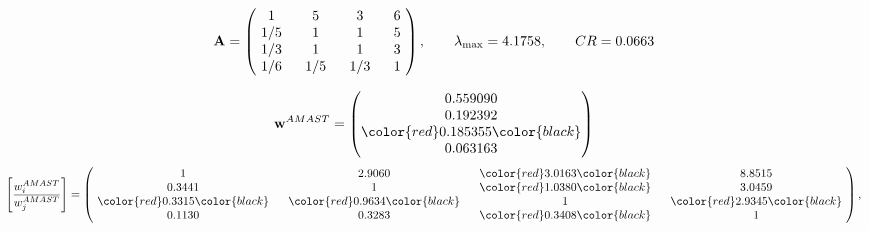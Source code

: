 \begin{example}
\begin{equation*}
\mathbf{A} =
\begin{pmatrix}
$\,\,$ 1 $\,\,$ & $\,\,$5$\,\,$ & $\,\,$3$\,\,$ & $\,\,$6 $\,\,$ \\
$\,\,$ 1/5$\,\,$ & $\,\,$ 1 $\,\,$ & $\,\,$1$\,\,$ & $\,\,$5 $\,\,$ \\
$\,\,$ 1/3$\,\,$ & $\,\,$ 1 $\,\,$ & $\,\,$ 1 $\,\,$ & $\,\,$3 $\,\,$ \\
$\,\,$ 1/6$\,\,$ & $\,\,$ 1/5$\,\,$ & $\,\,$ 1/3$\,\,$ & $\,\,$ 1  $\,\,$ \\
\end{pmatrix},
\qquad
\lambda_{\max} =
4.1758,
\qquad
CR = 0.0663
\end{equation*}

\begin{equation*}
\mathbf{w}^{AMAST} =
\begin{pmatrix}
0.559090\\
0.192392\\
\color{red} 0.185355\color{black} \\
0.063163
\end{pmatrix}\end{equation*}
\begin{equation*}
\left[ \frac{{w}^{AMAST}_i}{{w}^{AMAST}_j} \right] =
\begin{pmatrix}
$\,\,$ 1 $\,\,$ & $\,\,$2.9060$\,\,$ & $\,\,$\color{red} 3.0163\color{black} $\,\,$ & $\,\,$8.8515$\,\,$ \\
$\,\,$0.3441$\,\,$ & $\,\,$ 1 $\,\,$ & $\,\,$\color{red} 1.0380\color{black} $\,\,$ & $\,\,$3.0459  $\,\,$ \\
$\,\,$\color{red} 0.3315\color{black} $\,\,$ & $\,\,$\color{red} 0.9634\color{black} $\,\,$ & $\,\,$ 1 $\,\,$ & $\,\,$\color{red} 2.9345\color{black}  $\,\,$ \\
$\,\,$0.1130$\,\,$ & $\,\,$0.3283$\,\,$ & $\,\,$\color{red} 0.3408\color{black} $\,\,$ & $\,\,$ 1  $\,\,$ \\
\end{pmatrix},
\end{equation*}


\end{example}
